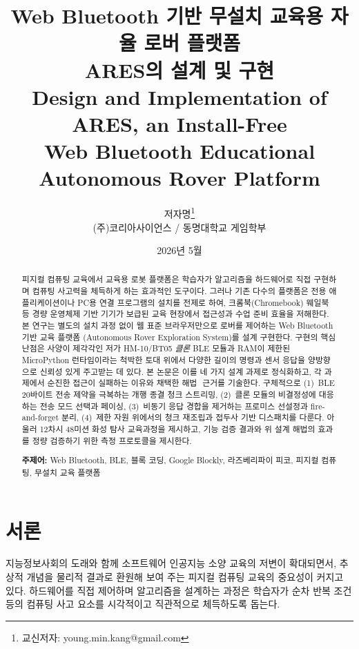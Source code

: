 \documentclass[10pt]{article}
\title{\vspace{-1.2em}\sffamily\bfseries\color{deepblue}%
  Web Bluetooth 기반 무설치 교육용 자율 로버 플랫폼\\[2pt]
  ARES의 설계 및 구현\\[6pt]
  {\rmfamily\normalsize\color{accentcopper}\mdseries
   Design and Implementation of ARES, an Install-Free\\
   Web Bluetooth Educational Autonomous Rover Platform}}
\author{\sffamily 저자명\thanks{교신저자: young.min.kang@gmail.com}\\
  \small (주)코리아사이언스 \quad / \quad 동명대학교 게임학부}
\date{\small 2026년 5월}
\begin{document}
\maketitle

\begin{abstract}
\noindent
피지컬 컴퓨팅 교육에서 교육용 로봇 플랫폼은 학습자가 알고리즘을 하드웨어로
직접 구현하며 컴퓨팅 사고력을 체득하게 하는 효과적인 도구이다. 그러나 기존
다수의 플랫폼은 전용 애플리케이션이나 PC용 연결 프로그램의 설치를 전제로 하여,
크롬북(Chromebook)\,\textperiodcentered\,웨일북 등 경량 운영체제 기반 기기가
보급된 교육 현장에서 접근성과 수업 준비 효율을 저해한다. 본 연구는 별도의 설치
과정 없이 웹 표준 브라우저만으로 로버를 제어하는 Web Bluetooth 기반 교육 플랫폼
(Autonomous Rover Exploration System)를 설계\,\textperiodcentered\,구현한다.
구현의 핵심 난점은 사양이 제각각인 저가 HM-10/BT05 \emph{클론} BLE 모듈과
RAM이 제한된 MicroPython 런타임이라는 척박한 토대 위에서 다양한 길이의 명령과
센서 응답을 양방향으로 신뢰성 있게 주고받는 데 있다. 본 논문은 이를 네 가지 설계
과제로 정식화하고, 각 과제에서 순진한 접근이 실패하는 이유와 채택한 해법
\,\textperiodcentered\,근거를 기술한다. 구체적으로 (1)~BLE 20바이트 전송 제약을
극복하는 개행 종결 청크 스트리밍, (2)~클론 모듈의 비결정성에 대응하는 전송 모드
선택과 페이싱, (3)~비동기 응답 경합을 제거하는 프로미스 선설정과
fire-and-forget 분리, (4)~제한 자원 위에서의 청크 재조립과 접두사 기반 디스패치를
다룬다. 아울러 12차시 48미션 화성 탐사 교육과정을 제시하고, 기능 검증 결과와 위
설계 해법의 효과를 정량 검증하기 위한 측정 프로토콜을 제시한다.

\smallskip
\noindent\textbf{주제어:} Web Bluetooth, BLE, 블록 코딩, Google Blockly,
라즈베리파이 피코, 피지컬 컴퓨팅, 무설치 교육 플랫폼
\end{abstract}

\section{서론}
\label{sec:intro}

지능정보사회의 도래와 함께 소프트웨어\,\textperiodcentered\,인공지능 소양 교육의
저변이 확대되면서, 추상적 개념을 물리적 결과로 환원해 보여 주는 피지컬 컴퓨팅
교육의 중요성이 커지고 있다. 하드웨어를 직접 제어하며 알고리즘을 설계하는 과정은
학습자가 순차\,\textperiodcentered\,반복\,\textperiodcentered\,조건 등의 컴퓨팅
사고 요소를 시각적이고 직관적으로 체득하도록 돕는다.
\end{document}
